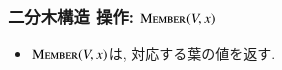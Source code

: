 \documentclass[main]{subfiles}
\begin{document}
\begin{frame}\frametitle{二分木構造 操作: $\mathrm{\text{M\textsc{ember}}}(V,x)$}
\begin{itemize}
\item $\mathrm{\text{M\textsc{ember}}}(V,x)$は, 対応する葉の値を返す.
\end{itemize}
 

\end{frame}
\end{document}
